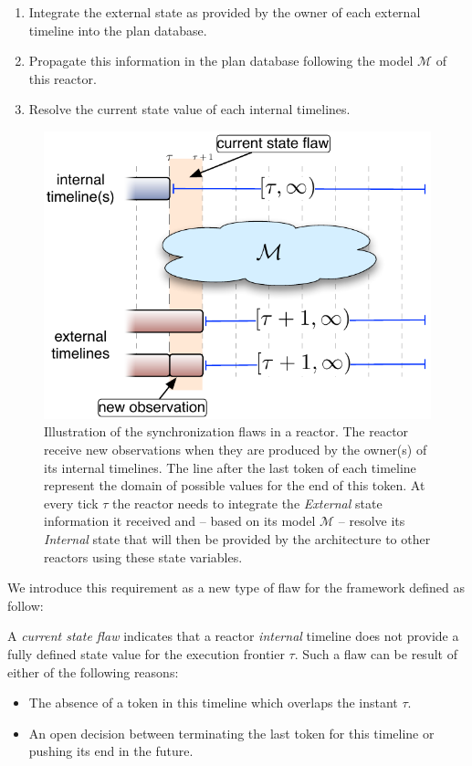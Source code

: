 \begin{enumerate}

\item Integrate the external state as provided by the owner of each
  external timeline into the plan database.

\item Propagate this information in the plan database following the
  model $\mathcal{M}$ of this reactor.

\item Resolve the current state value of each internal timelines.

\end{enumerate}

\begin{figure}[!htbp]
  \centering
  \includegraphics[width=0.5\columnwidth]{figs/synch-relation}
  \caption{\small Illustration of the synchronization flaws in a reactor. The
    reactor receive new observations when they are produced by the
    owner(s) of its internal timelines. The line after the last token
    of each timeline represent the domain of possible values for the
    end of this token. At every tick $\tau$ the reactor needs to
    integrate the {\em External} state information it received and --
    based on its model $\mathcal{M}$ -- resolve its {\em Internal}
    state that will then be provided by the architecture to other
    reactors using these state variables.}
  \label{fig:synch:flaw}
\end{figure}

We introduce this requirement as a new type of flaw for the \eu
framework defined as follow:

\begin{definition}
  \label{def:csf}
  A {\em current state flaw} indicates that a reactor {\em internal}
  timeline does not provide a fully defined state value for the
  execution frontier $\tau$. Such a flaw can be result of either of
  the following reasons:

  \begin{itemize}
  \item The absence of a token in this timeline which overlaps the
    instant $\tau$.
  \item An open decision between terminating the last token for this
    timeline or pushing its end in the future.
  \end{itemize}

\end{definition}

